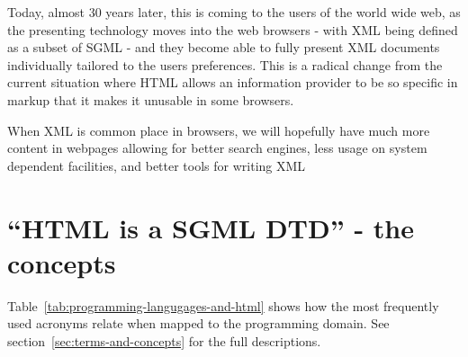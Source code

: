 Today, almost 30 years later, this is coming to the users of the world
wide web, as the presenting technology moves into the web browsers -
with XML being defined as a subset of SGML - and they become able to
fully present XML documents individually tailored to the users
preferences.  This is a radical change from the current situation
where HTML allows an information provider to be so specific in markup
that it makes it unusable in some browsers.

\textsf{When XML is common place in browsers, we will hopefully have
  much more content in webpages allowing for better search engines,
  less usage on system dependent facilities, and better tools for
  writing XML }


\section{``HTML is a SGML DTD'' - the concepts}

Table~\vref{tab:programming-langugages-and-html} shows how the most
frequently used acronyms relate when mapped to the programming domain.
See section~\vref{sec:terms-and-concepts} for the full descriptions.


